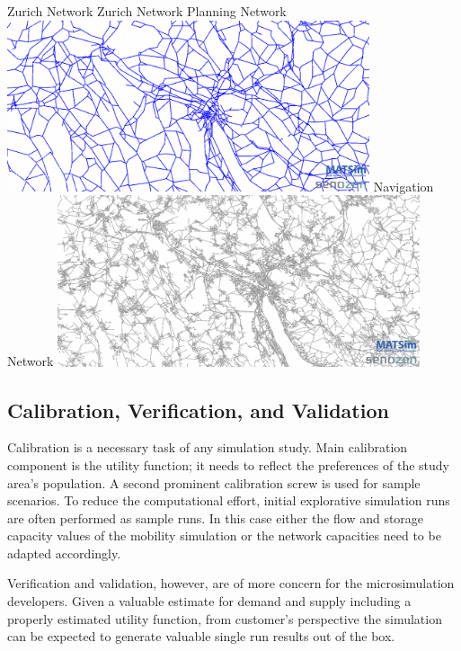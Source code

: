 \createfigure%
{Zurich Network}%
{Zurich Network}%
{\label{fig:zhnetwork}}%
{%
  \createsubfigure%
  {Planning Network}%
  {\includegraphics[width=0.8\textwidth,angle=0]{using/figures/planning.png}}%
  {\label{fig:planningnetwork}}%
  {}%
  \createsubfigure%
  {Navigation Network}%
	{\includegraphics[width=0.8\textwidth,angle=0]{using/figures/navigation.png}}%
  {\label{fig:navigationnetwork}}%
  {}%
}%
{}

\subsection{Calibration, Verification, and Validation}
Calibration is a necessary task of any simulation study. Main calibration component is the utility function; it needs to reflect the preferences of the study area's population. A second prominent calibration screw is used for sample scenarios. To reduce the computational effort, initial explorative simulation runs are often performed as sample runs. In this case either the flow and storage capacity values of the mobility simulation or the network capacities need to be adapted accordingly.

Verification and validation, however, are of more concern for the microsimulation developers. Given a valuable estimate for demand and supply including a properly estimated utility function, from customer's perspective the simulation can be expected to generate valuable single run results out of the box.

